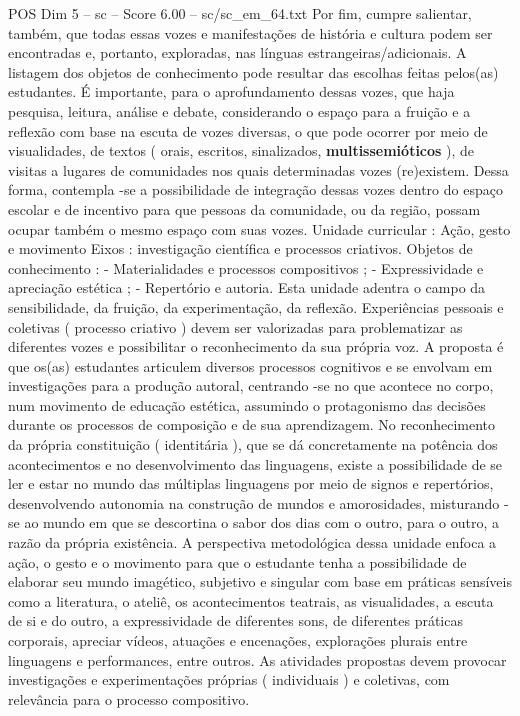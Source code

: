 \begin{textsample}{POS Dim 5 – sc – Score 6.00 – sc/sc\_em\_64.txt}
Por fim, cumpre salientar, também, que todas essas vozes e manifestações de história e cultura podem ser encontradas e, portanto, exploradas, nas línguas estrangeiras/adicionais.
A listagem dos objetos de conhecimento pode resultar das escolhas feitas pelos(as) estudantes.
É importante, para o aprofundamento dessas vozes, que haja pesquisa, leitura, análise e debate, considerando o espaço para a fruição e a reflexão com base na escuta de vozes diversas, o que pode ocorrer por meio de visualidades, de textos ( orais, escritos, sinalizados, \textbf{multissemióticos} ), de visitas a lugares de comunidades nos quais determinadas vozes (re)existem.
Dessa forma, contempla -se a possibilidade de integração dessas vozes dentro do espaço escolar e de incentivo para que pessoas da comunidade, ou da região, possam ocupar também o mesmo espaço com suas vozes.
Unidade curricular : Ação, gesto e movimento Eixos : investigação científica e processos criativos.
Objetos de conhecimento : - Materialidades e processos compositivos ; - Expressividade e apreciação estética ; - Repertório e autoria.
Esta unidade adentra o campo da sensibilidade, da fruição, da experimentação, da reflexão.
Experiências pessoais e coletivas ( processo criativo ) devem ser valorizadas para problematizar as diferentes vozes e possibilitar o reconhecimento da sua própria voz.
A proposta é que os(as) estudantes articulem diversos processos cognitivos e se envolvam em investigações para a produção autoral, centrando -se no que acontece no corpo, num movimento de educação estética, assumindo o protagonismo das decisões durante os processos de composição e de sua aprendizagem.
No reconhecimento da própria constituição ( identitária ), que se dá concretamente na potência dos acontecimentos e no desenvolvimento das linguagens, existe a possibilidade de se ler e estar no mundo das múltiplas linguagens por meio de signos e repertórios, desenvolvendo autonomia na construção de mundos e amorosidades, misturando -se ao mundo em que se descortina o sabor dos dias com o outro, para o outro, a razão da própria existência.
A perspectiva metodológica dessa unidade enfoca a ação, o gesto e o movimento para que o estudante tenha a possibilidade de elaborar seu mundo imagético, subjetivo e singular com base em práticas sensíveis como a literatura, o ateliê, os acontecimentos teatrais, as visualidades, a escuta de si e do outro, a expressividade de diferentes sons, de diferentes práticas corporais, apreciar vídeos, atuações e encenações, explorações plurais entre linguagens e performances, entre outros.
As atividades propostas devem provocar investigações e experimentações próprias ( individuais ) e coletivas, com relevância para o processo compositivo.

\end{textsample}
